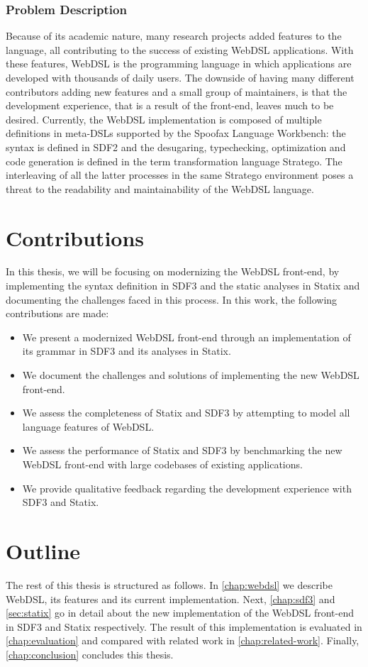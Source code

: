   \subsubsection{Problem Description}
  Because of its academic nature, many research projects added features to the language, all contributing to the success of existing WebDSL applications. With these features, WebDSL is the programming language in which applications are developed with thousands of daily users. The downside of having many different contributors adding new features and a small group of maintainers, is that the development experience, that is a result of the front-end, leaves much to be desired. Currently, the WebDSL implementation is composed of multiple definitions in meta-DSLs supported by the Spoofax Language Workbench: the syntax is defined in SDF2 and the desugaring, typechecking, optimization and code generation is defined in the term transformation language Stratego. The interleaving of all the latter processes in the same Stratego environment poses a threat to the readability and maintainability of the WebDSL language.

  \section{\label{sec:contributions}Contributions}
    In this thesis, we will be focusing on modernizing the WebDSL front-end, by implementing the syntax definition in SDF3 and the static analyses in Statix and documenting the challenges faced in this process. In this work, the following contributions are made:

    \begin{itemize}
      \item We present a modernized WebDSL front-end through an implementation of its grammar in SDF3 and its analyses in Statix.
      \item We document the challenges and solutions of implementing the new WebDSL front-end.
      \item We assess the completeness of Statix and SDF3 by attempting to model all language features of WebDSL.
      \item We assess the performance of Statix and SDF3 by benchmarking the new WebDSL front-end with large codebases of existing applications.
      \item We provide qualitative feedback regarding the development experience with SDF3 and Statix.
    \end{itemize}

  \section{\label{sec:outline}Outline}
    The rest of this thesis is structured as follows. In \cref{chap:webdsl} we describe WebDSL, its features and its current implementation. Next, \cref{chap:sdf3} and \cref{sec:statix} go in detail about the new implementation of the WebDSL front-end in SDF3 and Statix respectively. The result of this implementation is evaluated in \cref{chap:evaluation} and compared with related work in \cref{chap:related-work}. Finally, \cref{chap:conclusion} concludes this thesis.

